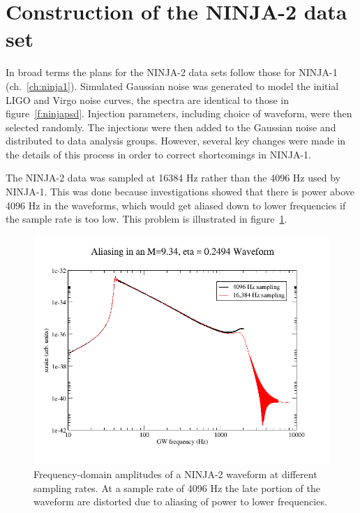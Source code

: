 \section{Construction of the NINJA-2 data set}


In broad terms the plans for the NINJA-2 data sets follow those for
NINJA-1 (ch.~\ref{ch:ninja1}).  Simulated Gaussian noise was generated
to model the initial LIGO and Virgo noise curves, the spectra are
identical to those in figure~\ref{f:ninjapsd}.  Injection parameters,
including choice of waveform, were then selected randomly.  The
injections were then added to the Gaussian noise and distributed to
data analysis groups.  However, several key changes were made in the
details of this process in order to correct shortcomings in NINJA-1.  

The NINJA-2 data was sampled at 16384 Hz rather than the 4096 Hz used
by NINJA-1.  This was done because investigations showed that there is
power above 4096 Hz in the waveforms, which would get aliased down to 
lower frequencies if the sample rate is too low.  This problem is
illustrated in figure~\ref{f:ninja2_aliasing}.

\begin{figure}
  \includegraphics[width=\linewidth]{figures/ninja2/ninja2_aliasing}
  \caption[Aliasing of waveform power]{
  \label{f:ninja2_aliasing}
Frequency-domain amplitudes of a NINJA-2 waveform at different
sampling rates.  At a sample rate of 4096 Hz the late portion of the
waveform are distorted due to aliasing of power to lower frequencies.
}
\end{figure}%

